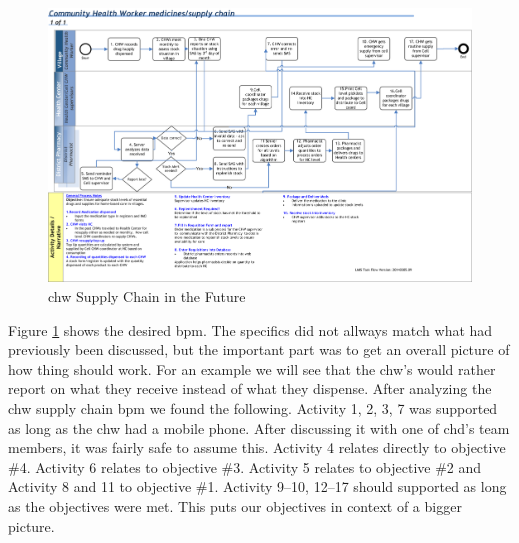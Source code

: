 \begin{figure}
\centering
\includegraphics[width=\textwidth]{case/img/chwSupplyChainFuture}
\caption{\gls{chw} Supply Chain in the Future}
\label{fig:chwSupplyChainFuture}
\end{figure}

Figure \ref{fig:chwSupplyChainFuture} shows the desired \gls{bpm}. The specifics did not allways match what had previously been discussed, but the important part was to get an overall picture of how thing should work. For an example we will see that the \gls{chw}'s would rather report on what they receive instead of what they dispense. After analyzing the \gls{chw} supply chain \gls{bpm} we found the following. 
Activity 1, 2, 3, 7 was supported as long as the \gls{chw} had a mobile phone. After discussing it with one of \gls{chd}'s team members, it was fairly safe to assume this. 
Activity 4 relates directly to objective \#4.
Activity 6 relates to objective \#3. 
Activity 5 relates to objective \#2 and Activity 8 and 11 to objective \#1. Activity 9--10, 12--17 should supported as long as the objectives were met. 
This puts our objectives in context of a bigger picture.


